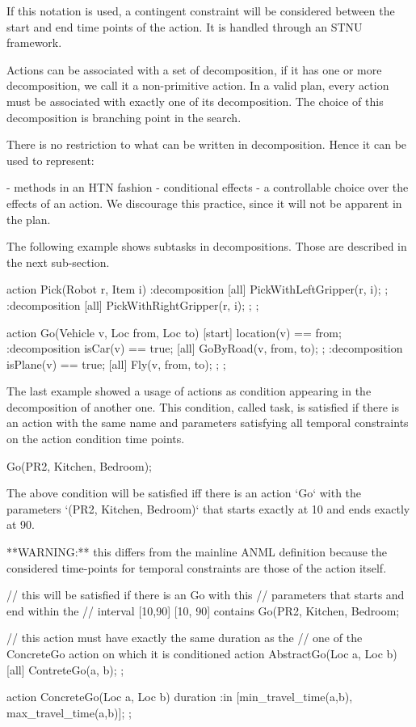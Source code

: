 If this notation is used, a contingent constraint will be considered between the start and end time points of the action.
It is handled through an STNU framework.


Actions can be associated with a set of decomposition, if it has one or more decomposition, we call it a non-primitive action.
In a valid plan, every action must be associated with exactly one of its decomposition.
The choice of this decomposition is branching point in the search.

There is no restriction to what can be written in decomposition. Hence it can be used to represent:

- methods in an HTN fashion
- conditional effects
- a controllable choice over the effects of an action. We discourage this practice, since it will not be apparent in the plan.

The following example shows subtasks in decompositions. Those are described in the next sub-section.

\begin{anmlcode}
action Pick(Robot r, Item i) {
  :decomposition{
    [all] PickWithLeftGripper(r, i);
  };
  :decomposition{
    [all] PickWithRightGripper(r, i);
  };
};

action Go(Vehicle v, Loc from, Loc to) {
  [start] location(v) == from;
  :decomposition{
      isCar(v) == true;
      [all] GoByRoad(v, from, to);
  };
  :decomposition{
    isPlane(v) == true;
    [all] Fly(v, from, to);
  };
};
\end{anmlcode}


The last example showed a usage of actions as condition appearing in the decomposition of another one.
This condition, called task, is satisfied if there is an action with the same name and parameters satisfying all temporal constraints on the action condition time points.
\begin{anmlcode}
[10,90] Go(PR2, Kitchen, Bedroom);
\end{anmlcode}
  
The above condition will be satisfied iff there is an action `Go` with the parameters `(PR2, Kitchen, Bedroom)` that starts exactly at 10 and ends exactly at 90.

**WARNING:** this differs from the mainline ANML definition because the considered time-points for temporal constraints are those of the action itself.
\begin{anmlcode}
// this will be satisfied if there is an Go with this
// parameters that starts and end within the
// interval [10,90]
[10, 90] contains Go(PR2, Kitchen, Bedroom;

// this action must have exactly the same duration as the
// one of the ConcreteGo action on which it is conditioned 
action AbstractGo(Loc a, Loc b) {
  [all] ContreteGo(a, b);
};

action ConcreteGo(Loc a, Loc b) {
  duration :in [min_travel_time(a,b), max_travel_time(a,b)];
};
\end{anmlcode}

